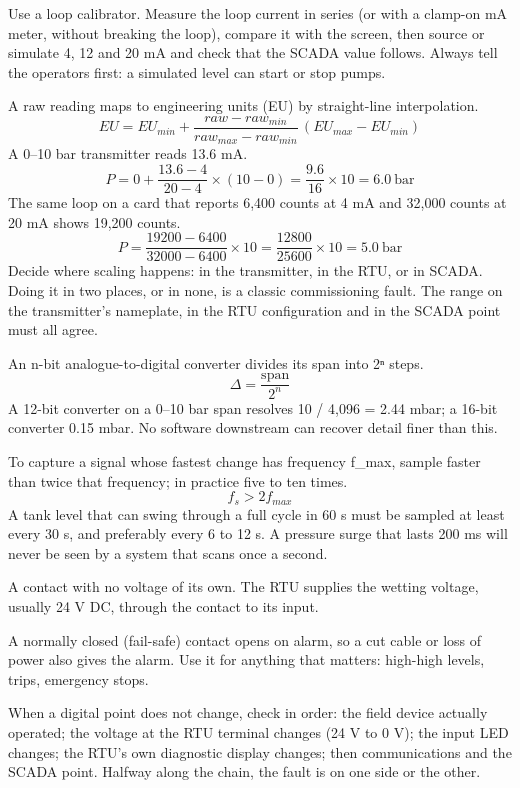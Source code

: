 \onsite Use a loop calibrator. Measure the loop current in series (or with a clamp-on mA meter, without breaking the loop), compare it with the screen, then source or simulate 4, 12 and 20 mA and check that the SCADA value follows. Always tell the operators first: a simulated level can start or stop pumps.

 A raw reading maps to engineering units (EU) by straight-line interpolation.
\[ EU = EU_{min} + \frac{raw - raw_{min}}{raw_{max} - raw_{min}}\,(EU_{max} - EU_{min}) \]
 A 0–10 bar transmitter reads 13.6 mA.
\[ P = 0 + \frac{13.6 - 4}{20 - 4} \times (10 - 0) = \frac{9.6}{16} \times 10 = 6.0\ \text{bar} \]
 The same loop on a card that reports 6,400 counts at 4 mA and 32,000 counts at 20 mA shows 19,200 counts.
\[ P = \frac{19200 - 6400}{32000 - 6400} \times 10 = \frac{12800}{25600} \times 10 = 5.0\ \text{bar} \]
 Decide where scaling happens: in the transmitter, in the RTU, or in SCADA. Doing it in two places, or in none, is a classic commissioning fault. The range on the transmitter's nameplate, in the RTU configuration and in the SCADA point must all agree.

 An n-bit analogue-to-digital converter divides its span into 2ⁿ steps.
\[ \Delta = \frac{\text{span}}{2^n} \]
A 12-bit converter on a 0–10 bar span resolves 10 / 4,096 = 2.44 mbar; a 16-bit converter 0.15 mbar. No software downstream can recover detail finer than this.

 To capture a signal whose fastest change has frequency f\_max, sample faster than twice that frequency; in practice five to ten times.
\[ f_s > 2 f_{max} \]
A tank level that can swing through a full cycle in 60 s must be sampled at least every 30 s, and preferably every 6 to 12 s. A pressure surge that lasts 200 ms will never be seen by a system that scans once a second.

 A contact with no voltage of its own. The RTU supplies the wetting voltage, usually 24 V DC, through the contact to its input.

 A normally closed (fail-safe) contact opens on alarm, so a cut cable or loss of power also gives the alarm. Use it for anything that matters: high-high levels, trips, emergency stops.

\onsite When a digital point does not change, check in order: the field device actually operated; the voltage at the RTU terminal changes (24 V to 0 V); the input LED changes; the RTU's own diagnostic display changes; then communications and the SCADA point. Halfway along the chain, the fault is on one side or the other.

